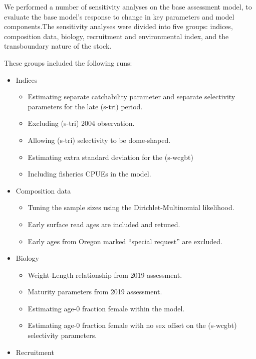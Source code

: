 \documentclass[
]{scrartcl}
\providecommand{\tightlist}{%
  \setlength{\itemsep}{0pt}\setlength{\parskip}{0pt}}\usepackage{longtable,booktabs,array}
\begin{document}
We performed a number of sensitivity analyses on the base assessment
model, to evaluate the base model's response to change in key parameters
and model components.The sensitivity analyses were divided into five
groups: indices, composition data, biology, recruitment and
environmental index, and the transboundary nature of the stock.

These groups included the following runs:

\begin{itemize}
\tightlist
\item
  Indices

  \begin{itemize}
  \tightlist
  \item
    Estimating separate catchability parameter and separate selectivity
    parameters for the late (s-tri) period.
  \item
    Excluding (s-tri) 2004 observation.
  \item
    Allowing (s-tri) selectivity to be dome-shaped.
  \item
    Estimating extra standard deviation for the (s-wcgbt)
  \item
    Including fisheries CPUEs in the model.
  \end{itemize}
\item
  Composition data

  \begin{itemize}
  \tightlist
  \item
    Tuning the sample sizes using the Dirichlet-Multinomial likelihood.
  \item
    Early surface read ages are included and retuned.
  \item
    Early ages from Oregon marked ``special request'' are excluded.
  \end{itemize}
\item
  Biology

  \begin{itemize}
  \tightlist
  \item
    Weight-Length relationship from 2019 assessment.
  \item
    Maturity parameters from 2019 assessment.
  \item
    Estimating age-0 fraction female within the model.
  \item
    Estimating age-0 fraction female with no sex offset on the (s-wcgbt)
    selectivity parameters.
  \end{itemize}
\item
  Recruitment


\end{itemize}
\end{document}
